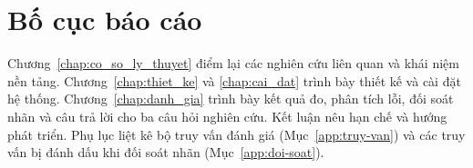 \section{Bố cục báo cáo}
\label{sec:bo-cuc}

Chương~\ref{chap:co_so_ly_thuyet} điểm lại các nghiên cứu liên quan và khái niệm nền tảng. Chương~\ref{chap:thiet_ke} và \ref{chap:cai_dat} trình bày thiết kế và cài đặt hệ thống. Chương~\ref{chap:danh_gia} trình bày kết quả đo, phân tích lỗi, đối soát nhãn và câu trả lời cho ba câu hỏi nghiên cứu. Kết luận nêu hạn chế và hướng phát triển. Phụ lục liệt kê bộ truy vấn đánh giá (Mục~\ref{app:truy-van}) và các truy vấn bị đánh dấu khi đối soát nhãn (Mục~\ref{app:doi-soat}).
